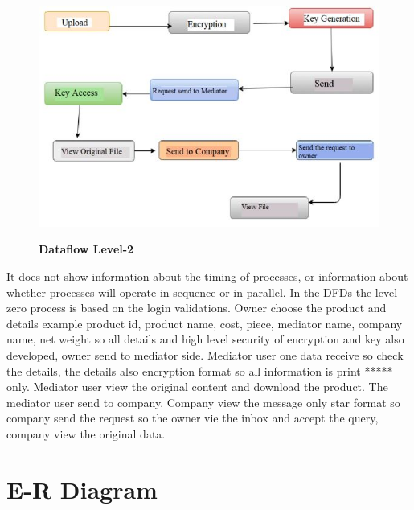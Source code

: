 \documentclass[BTech]{srmuthesis}
\begin{document}
\begin{figure}[H]
\centering
\includegraphics[scale=0.8]{level2.jpg}
\label{fig:1}\hspace{10mm}
\caption{\textbf{Dataflow Level-2}}
\end{figure}
It does not show information about the timing of processes, or information about whether processes will operate in sequence or in parallel. In the DFDs the level zero process is based on the login validations. Owner choose the product and details example product id, product name, cost, piece, mediator name, company name, net weight so all details and high level security of encryption and key also developed,  owner  send to mediator side. Mediator user one data receive so check the details, the details also encryption format so all information is print ***** only. Mediator user view the original content and download the product. The mediator user send to company. Company view the message only star format so company send the request so the owner vie the inbox and accept the query, company view the original data.
\section{E-R Diagram}
\end{document}
